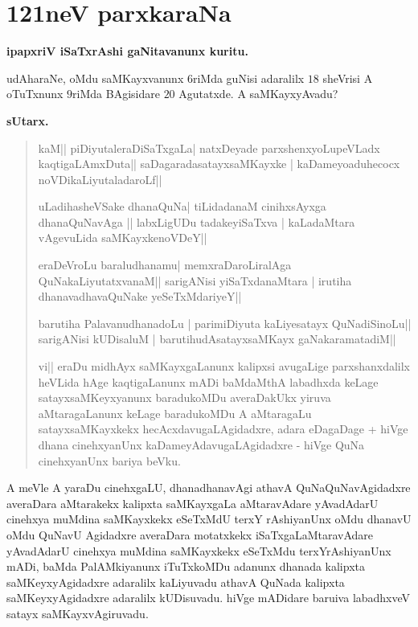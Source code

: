 \chapter{121neV parxkaraNa}

\begin{center}
{\bf\large ipapxriV iSaTxrAshi gaNitavanunx kuritu.}
\end{center}

udAharaNe, oMdu saMKayxvanunx $6$riMda guNisi adaralilx $18$ sheVrisi A oTuTxnunx $9$riMda BAgisidare $20$ Agutatxde. A saMKayxyAvadu?

\begin{center}
{\bf\large sUtarx.}
\end{center}

\begin{verse}
kaM|| piDiyutaleraDiSaTxgaLa| natxDeyade parxshenxyoLupeVLadx kaqtigaLAmxDuta|| saDagaradasatayxsaMKayxke | kaDameyoaduhecocx noVDikaLiyutaladaroLf||

uLadihasheVSake dhanaQuNa| tiLidadanaM cinihxsAyxga dhanaQuNavAga || labxLigUDu
tadakeyiSaTxva | kaLadaMtara vAgevuLida saMKayxkenoVDeY||

eraDeVroLu baraludhanamu| memxraDaroLiralAga QuNakaLiyutatxvanaM||
sarigANisi yiSaTxdanaMtara | irutiha dhanavadhavaQuNake yeSeTxMdariyeY||

barutiha PalavanudhanadoLu | parimiDiyuta kaLiyesatayx QuNadiSinoLu||
sarigANisi kUDisaluM | barutihudAsatayxsaMKayx gaNakaramatadiM||

vi|| eraDu midhAyx saMKayxgaLanunx kalipxsi avugaLige parxshanxdalilx heVLida hAge kaqtigaLanunx mADi baMdaMthA labadhxda keLage satayxsaMKeyxyanunx baradukoMDu averaDakUkx yiruva aMtaragaLanunx keLage baradukoMDu A aMtaragaLu satayxsaMKayxkekx hecAcxdavugaLAgidadxre, adara eDagaDage + hiVge dhana cinehxyanUnx kaDameyAdavugaLAgidadxre - hiVge QuNa cinehxyanUnx bariya beVku.
\end{verse}

A meVle A yaraDu cinehxgaLU, dhanadhanavAgi athavA QuNaQuNavAgidadxre averaDara aMtarakekx kalipxta saMKayxgaLa aMtaravAdare yAvadAdarU cinehxya muMdina saMKayxkekx eSeTxMdU terxY rAshiyanUnx oMdu dhanavU oMdu QuNavU Agidadxre averaDara motatxkekx iSaTxgaLaMtaravAdare yAvadAdarU cinehxya muMdina saMKayxkekx eSeTxMdu terxYrAshiyanUnx mADi, baMda PalAMkiyanunx iTuTxkoMDu adanunx dhanada kalipxta saMKeyxyAgidadxre adaralilx kaLiyuvadu athavA QuNada kalipxta saMKeyxyAgidadxre adaralilx kUDisuvadu. hiVge mADidare baruiva labadhxveV satayx saMKayxvAgiruvadu.

